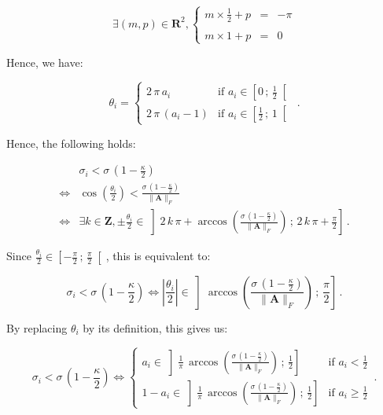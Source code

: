 \documentclass[11pt, a4paper]{article}
\begin{document}
                \[\exists(m,p)\in\mathbf{R}^2,\left\{\begin{array}{lcl}m\times\frac12+p &=& -\pi\\\\m\times1 + p &=& 0\end{array}\right.\]
                
                Hence, we have:
                
                \[\theta_i = \begin{cases}2\,\pi\,a_i&\text{if }a_i\in\left[0\,;\,\frac12\right[\\2\,\pi\,\left(a_i-1\right)&\text{if }a_i\in\left[\frac12\,;\,1\right[\end{cases}\,.\]
                
                Hence, the following holds:
                
                \begin{align*}
                    &\sigma_i < \sigma\,\left(1 - \frac\kappa2\right)\\
                    \iff&\cos\left(\frac{\theta_i}{2}\right) < \frac{\sigma\,\left(1 - \frac\kappa2\right)}{\|\mathbf{A}\|_F}\\
                    \iff&\exists k\in\mathbf{Z},\pm\frac{\theta_i}{2}\in\left]2\,k\,\pi + \arccos\left(\frac{\sigma\,\left(1 - \frac\kappa2\right)}{\|\mathbf{A}\|_F}\right)\,;\,2\,k\,\pi + \frac\pi2\right]\,.
                \end{align*}
                
                Since \(\frac{\theta_i}{2}\in\left[-\frac\pi2\,;\,\frac\pi2\right[\), this is equivalent to:
                
                \[\sigma_i < \sigma\,\left(1 - \frac\kappa2\right)\iff\left|\frac{\theta_i}{2}\right|\in\left]\arccos\left(\frac{\sigma\,\left(1 - \frac\kappa2\right)}{\|\mathbf{A}\|_F}\right)\,;\,\frac\pi2\right]\,.\]
                
                By replacing \(\theta_i\) by its definition, this gives us:
                
                \[\sigma_i < \sigma\,\left(1 - \frac\kappa2\right)\iff\begin{cases}a_i\in\left]\frac1\pi\,\arccos\left(\frac{\sigma\,\left(1 - \frac\kappa2\right)}{\|\mathbf{A}\|_F}\right)\,;\,\frac12\right]&\text{if }a_i<\frac12\\1-a_i\in\left]\frac1\pi\,\arccos\left(\frac{\sigma\,\left(1 - \frac\kappa2\right)}{\|\mathbf{A}\|_F}\right)\,;\,\frac12\right]&\text{if }a_i\geqslant\frac12\end{cases}\,.\]
                
\end{document}
